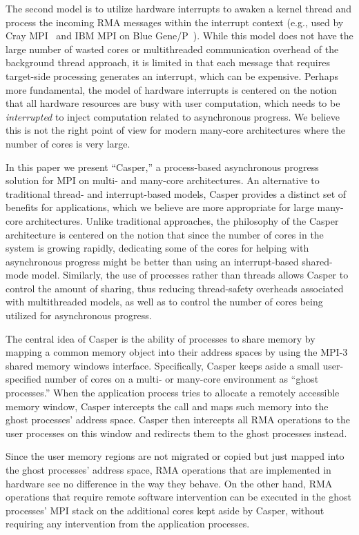 The second model is to utilize hardware interrupts to awaken a kernel
thread and process the incoming RMA messages within the interrupt
context (e.g., used by Cray MPI~\cite{craympi} and IBM MPI on Blue
Gene/P~\cite[Chapter~7]{ibmmpibgp}).  While this model does not have
the large number of wasted cores or multithreaded communication
overhead of the background thread approach, it is limited in that each
message that requires target-side processing generates an interrupt,
which can be expensive.  Perhaps more fundamental, the model of
hardware interrupts is centered on the notion that all
hardware resources are busy with user computation, which needs to be
\emph{interrupted} to inject computation related to asynchronous
progress.  We believe this is not the right point of view for modern
many-core architectures where the number of cores is very large.

In this paper we present ``Casper,'' a process-based asynchronous
progress solution for MPI on multi- and many-core architectures.
An alternative to traditional thread- and interrupt-based
models, Casper provides a distinct set of benefits for applications,
 which we believe are more appropriate for large many-core
architectures.  Unlike traditional approaches, the philosophy of the
Casper architecture is centered on the notion that since the number of
cores in the system is growing rapidly, dedicating some of
the cores for helping with asynchronous progress might be better
than using an interrupt-based shared-mode model.  Similarly, the use
of processes rather than threads allows Casper to control the amount
of sharing, thus reducing thread-safety overheads associated with
multithreaded models, as well as to control the number of cores being
utilized for asynchronous progress.

The central idea of Casper is the ability of processes to share
memory by mapping a common memory object into their address spaces
by using the MPI-3 shared memory windows interface.  Specifically, Casper
keeps aside a small user-specified number of cores on a multi- or
many-core environment as ``ghost processes.''  When the application
process tries to allocate a remotely accessible memory window, Casper
intercepts the call and maps such memory into the ghost processes'
address space.  Casper then intercepts all RMA operations to the user
processes on this window and redirects them to the ghost processes
instead.

Since the user memory regions are not migrated or copied but just
mapped into the ghost processes' address space, RMA operations that
are implemented in hardware see no difference in the way they behave.
On the other hand, RMA operations that require remote software
intervention can be executed in the ghost processes' MPI stack on the
additional cores kept aside by Casper, without requiring any
intervention from the application processes.

